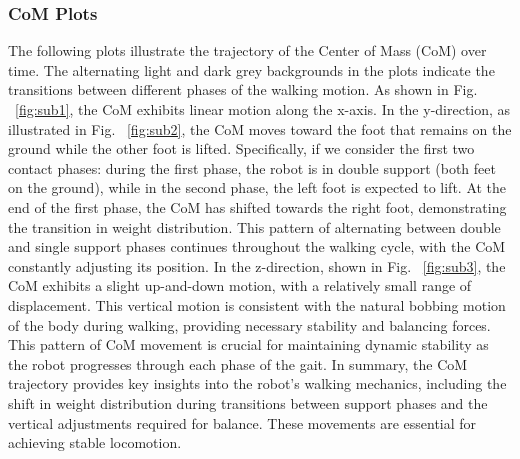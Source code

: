 \documentclass[main.tex]{subfiles}
\begin{document}
\subsubsection*{CoM Plots}
The following plots illustrate the trajectory of the Center of Mass (CoM) over time. The alternating light and dark grey backgrounds in the plots indicate the transitions between different phases of the walking motion. As shown in Fig. ~\ref{fig:sub1}, the CoM exhibits linear motion along the x-axis.
In the y-direction, as illustrated in Fig. ~\ref{fig:sub2}, the CoM moves toward the foot that remains on the ground while the other foot is lifted. Specifically, if we consider the first two contact phases: during the first phase, the robot is in double support (both feet on the ground), while in the second phase, the left foot is expected to lift. At the end of the first phase, the CoM has shifted towards the right foot, demonstrating the transition in weight distribution. This pattern of alternating between double and single support phases continues throughout the walking cycle, with the CoM constantly adjusting its position.
In the z-direction, shown in Fig. ~\ref{fig:sub3}, the CoM exhibits a slight up-and-down motion, with a relatively small range of displacement. This vertical motion is consistent with the natural bobbing motion of the body during walking, providing necessary stability and balancing forces. This pattern of CoM movement is crucial for maintaining dynamic stability as the robot progresses through each phase of the gait.
In summary, the CoM trajectory provides key insights into the robot’s walking mechanics, including the shift in weight distribution during transitions between support phases and the vertical adjustments required for balance. These movements are essential for achieving stable locomotion.
\end{document}
